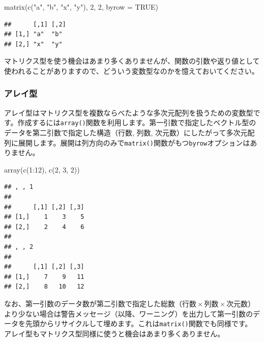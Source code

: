 \documentclass[
  12pt,
]{book}
\newenvironment{Shaded}{\begin{snugshade}}{\end{snugshade}}
\newcommand{\AttributeTok}[1]{\textcolor[rgb]{0.77,0.63,0.00}{#1}}
\newcommand{\ConstantTok}[1]{\textcolor[rgb]{0.00,0.00,0.00}{#1}}
\newcommand{\DecValTok}[1]{\textcolor[rgb]{0.00,0.00,0.81}{#1}}
\newcommand{\FunctionTok}[1]{\textcolor[rgb]{0.00,0.00,0.00}{#1}}
\newcommand{\NormalTok}[1]{#1}
\newcommand{\SpecialCharTok}[1]{\textcolor[rgb]{0.00,0.00,0.00}{#1}}
\newcommand{\StringTok}[1]{\textcolor[rgb]{0.31,0.60,0.02}{#1}}
\begin{document}
\begin{Shaded}
\begin{Highlighting}[]
\FunctionTok{matrix}\NormalTok{(}\FunctionTok{c}\NormalTok{(}\StringTok{"a"}\NormalTok{, }\StringTok{"b"}\NormalTok{, }\StringTok{"x"}\NormalTok{, }\StringTok{"y"}\NormalTok{), }\DecValTok{2}\NormalTok{, }\DecValTok{2}\NormalTok{, }\AttributeTok{byrow =} \ConstantTok{TRUE}\NormalTok{)}
\end{Highlighting}
\end{Shaded}

\begin{verbatim}
##      [,1] [,2]
## [1,] "a"  "b" 
## [2,] "x"  "y"
\end{verbatim}

マトリクス型を使う機会はあまり多くありませんが、関数の引数や返り値として使われることがありますので、どういう変数型なのかを憶えておいてください。

\hypertarget{ux30a2ux30ecux30a4ux578b}{%
\subsubsection{アレイ型}\label{ux30a2ux30ecux30a4ux578b}}

アレイ型はマトリクス型を複数ならべたような多次元配列を扱うための変数型です。作成するには\texttt{array()}関数を利用します。第一引数で指定したベクトル型のデータを第二引数で指定した構造（行数, 列数, 次元数）にしたがって多次元配列に展開します。展開は列方向のみで\texttt{matrix()}関数がもつ\texttt{byrow}オプションはありません。

\begin{Shaded}
\begin{Highlighting}[]
\FunctionTok{array}\NormalTok{(}\FunctionTok{c}\NormalTok{(}\DecValTok{1}\SpecialCharTok{:}\DecValTok{12}\NormalTok{), }\FunctionTok{c}\NormalTok{(}\DecValTok{2}\NormalTok{, }\DecValTok{3}\NormalTok{, }\DecValTok{2}\NormalTok{))}
\end{Highlighting}
\end{Shaded}

\begin{verbatim}
## , , 1
## 
##      [,1] [,2] [,3]
## [1,]    1    3    5
## [2,]    2    4    6
## 
## , , 2
## 
##      [,1] [,2] [,3]
## [1,]    7    9   11
## [2,]    8   10   12
\end{verbatim}

なお、第一引数のデータ数が第二引数で指定した総数（\(\mbox{行数} \times \mbox{列数} \times \mbox{次元数}\)）より少ない場合は警告メッセージ（以降、ワーニング）を出力して第一引数のデータを先頭からリサイクルして埋めます。これは\texttt{matrix()}関数でも同様です。 アレイ型もマトリクス型同様に使うと機会はあまり多くありません。
\end{document}
